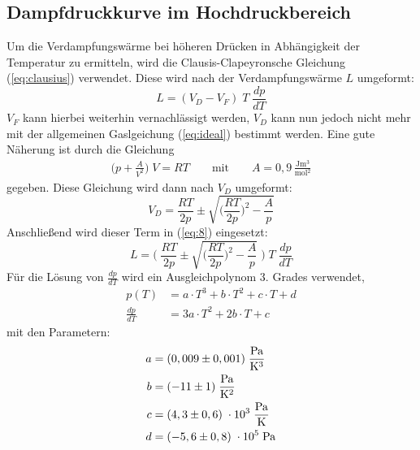 \subsection{Dampfdruckkurve im Hochdruckbereich}
Um die Verdampfungswärme bei höheren Drücken in Abhängigkeit der Temperatur zu
ermitteln, wird die Clausis-Clapeyronsche Gleichung (\ref{eq:clausius}) verwendet.
Diese wird nach der Verdampfungswärme $L$ umgeformt:
\begin{equation}
  L = (V_D - V_F) \;T\; \frac{dp}{dT} \label{eq:8}
\end{equation}
$V_F$ kann hierbei weiterhin vernachlässigt werden, $V_D$ kann nun jedoch nicht mehr
mit der allgemeinen Gaslgeichung (\ref{eq:ideal}) bestimmt werden.
Eine gute Näherung ist durch die Gleichung
\begin{align}
  \biggr(p + \frac{A}{V^2}\biggl) \; V = RT \qquad \text{mit} \qquad A = 0,9 \,\frac{\si{\joule \meter^3}}
  {\si{\mol^2}}
\end{align}
gegeben.
Diese Gleichung wird dann nach $V_D$ umgeformt:
\begin{equation}
  V_D = \frac{RT}{2p} \pm \sqrt{\biggr(\frac{RT}{2p}\biggl)^2-\frac{A}{p}}
\end{equation}
Anschließend wird dieser Term in (\ref{eq:8}) eingesetzt:
\begin{equation}
  L = \Biggr(\; \frac{RT}{2p} \pm \sqrt{\biggr(\frac{RT}{2p}\biggl)^2-\frac{A}{p}} \; \Biggl)
  \; T \; \frac{dp}{dT}
\end{equation}
Für die Lösung von $\frac{dp}{dT}$ wird ein Ausgleichpolynom 3. Grades verwendet,
\begin{align}
  p(T) &= a \cdot T^3 + b \cdot T^2 + c \cdot T + d  \label{eq:pt}\\
  \frac{dp}{dT} &= 3a \cdot T^2 + 2b \cdot T +  c  \label{eq:dp}
\end{align}
mit den Parametern:
\begin{align*}
  a &= (0,009 \pm 0,001) \; \si{\frac{\pascal}{\kelvin^3}} \\
  b &= (-11 \pm 1) \; \si{\frac{\pascal}{\kelvin^2}} \\
  c &= (4,3 \pm 0,6) \; \cdot 10^3 \; \si{\frac{\pascal}{\kelvin}} \\
  d &= (-5,6 \pm 0,8)\; \cdot 10^5 \; \si{\pascal}
\end{align*}


